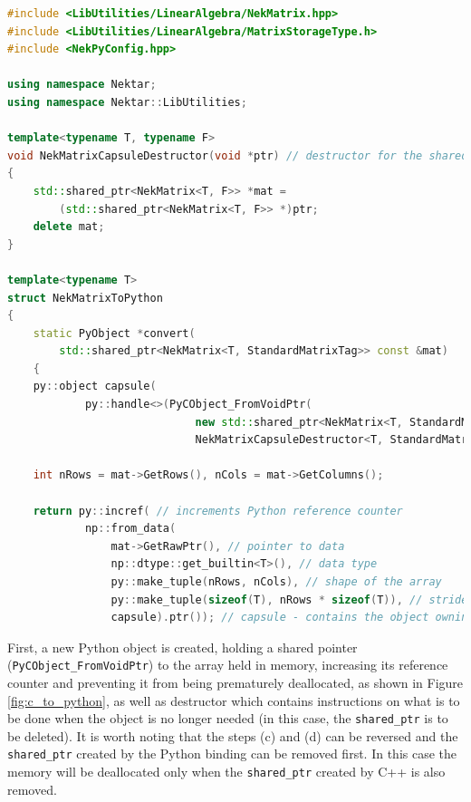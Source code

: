 \begin{lstlisting}[caption={Converter method for converting the C++ arrays into Python NumPy arrays.}, label={lst:c_to_python}, language=C++]
#include <LibUtilities/LinearAlgebra/NekMatrix.hpp>
#include <LibUtilities/LinearAlgebra/MatrixStorageType.h>
#include <NekPyConfig.hpp>

using namespace Nektar;
using namespace Nektar::LibUtilities;

template<typename T, typename F>
void NekMatrixCapsuleDestructor(void *ptr) // destructor for the shared_ptr to data
{
    std::shared_ptr<NekMatrix<T, F>> *mat =
        (std::shared_ptr<NekMatrix<T, F>> *)ptr;
    delete mat;
}

template<typename T>
struct NekMatrixToPython
{
    static PyObject *convert(
        std::shared_ptr<NekMatrix<T, StandardMatrixTag>> const &mat)
    {
    py::object capsule(
            py::handle<>(PyCObject_FromVoidPtr(
                             new std::shared_ptr<NekMatrix<T, StandardMatrixTag>>(mat), // new shared_ptr to the data
                             NekMatrixCapsuleDestructor<T, StandardMatrixTag>))); // destructor method
                             
    int nRows = mat->GetRows(), nCols = mat->GetColumns();
    
    return py::incref( // increments Python reference counter
            np::from_data(
                mat->GetRawPtr(), // pointer to data
                np::dtype::get_builtin<T>(), // data type
                py::make_tuple(nRows, nCols), // shape of the array
                py::make_tuple(sizeof(T), nRows * sizeof(T)), // stride of the array
                capsule).ptr()); // capsule - contains the object owning the data (preventing it from being prematurely deallocated)
\end{lstlisting}

First, a new Python object is created, holding a shared pointer (\texttt{PyCObject\_FromVoidPtr}) 
to the array held in memory, increasing its reference counter and preventing it from being 
prematurely deallocated, as shown in Figure \ref{fig:c_to_python}, as well as destructor which 
contains instructions on what is to be done when the object is no longer needed (in this case, 
the \texttt{shared\_ptr} is to be deleted). It is worth noting that the steps (c) and (d) can 
be reversed and the \texttt{shared\_ptr} created by the Python binding can be removed first. 
In this case the memory will be deallocated only when the \texttt{shared\_ptr} created by C++ 
is also removed.

